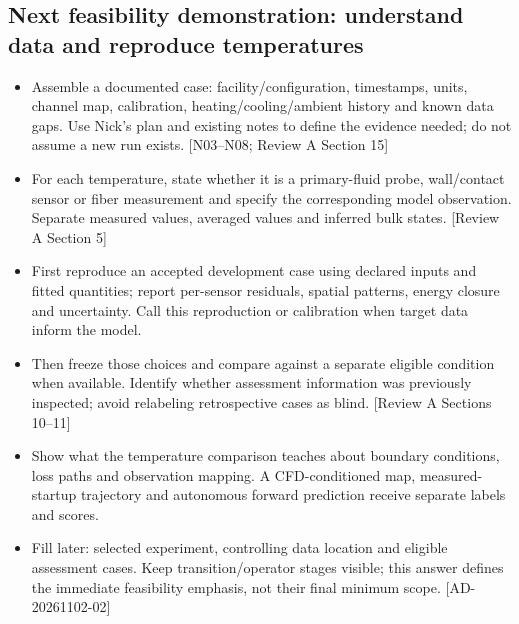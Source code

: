 \subsection{Next feasibility demonstration: understand data and reproduce temperatures}
\begin{itemize}[leftmargin=*]
\item Assemble a documented case: facility/configuration, timestamps, units, channel map, calibration, heating/cooling/ambient history and known data gaps. Use Nick's plan and existing notes to define the evidence needed; do not assume a new run exists. [N03--N08; Review A Section 15]
\item For each temperature, state whether it is a primary-fluid probe, wall/contact sensor or fiber measurement and specify the corresponding model observation. Separate measured values, averaged values and inferred bulk states. [Review A Section 5]\cite{jcgm2020measurementmodels}
\item First reproduce an accepted development case using declared inputs and fitted quantities; report per-sensor residuals, spatial patterns, energy closure and uncertainty. Call this reproduction or calibration when target data inform the model.
\item Then freeze those choices and compare against a separate eligible condition when available. Identify whether assessment information was previously inspected; avoid relabeling retrospective cases as blind. [Review A Sections 10--11]
\item Show what the temperature comparison teaches about boundary conditions, loss paths and observation mapping. A CFD-conditioned map, measured-startup trajectory and autonomous forward prediction receive separate labels and scores.
\item Fill later: selected experiment, controlling data location and eligible assessment cases. Keep transition/operator stages visible; this answer defines the immediate feasibility emphasis, not their final minimum scope. [AD-20261102-02]
\end{itemize}

